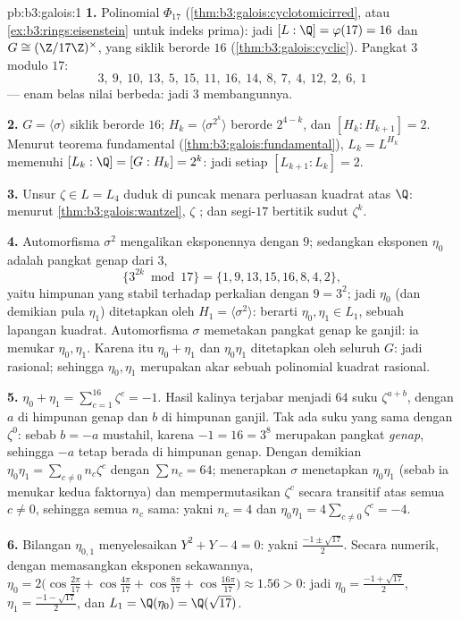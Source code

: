 \begin{solution}{pb:b3:galois:1}
\textbf{1.} Polinomial $\Phi_{17}$ 
(\cref{thm:b3:galois:cyclotomicirred}, atau
\cref{ex:b3:rings:eisenstein} untuk indeks prima): jadi $[L:\Q] =
\varphi(17) = 16$ dan $G \cong (\Z/17\Z)^\times$, yang siklik berorde
$16$ (\cref{thm:b3:galois:cyclic}). Pangkat $3$ modulo
$17$:
\[
3,\ 9,\ 10,\ 13,\ 5,\ 15,\ 11,\ 16,\ 14,\ 8,\ 7,\ 4,\ 12,\ 2,\
6,\ 1
\]
--- enam belas nilai berbeda: jadi $3$ membangunnya.

\textbf{2.} $G = \langle\sigma\rangle$ siklik berorde $16$;
$H_k = \langle\sigma^{2^k}\rangle$ berorde $2^{4-k}$, dan
$[H_k : H_{k+1}] = 2$. Menurut teorema fundamental
(\cref{thm:b3:galois:fundamental}), $L_k = L^{H_k}$ memenuhi
$[L_k : \Q] = [G : H_k] = 2^k$: jadi setiap $[L_{k+1}:L_k] = 2$.

\textbf{3.} Unsur $\zeta \in L = L_4$ duduk di puncak menara perluasan
kuadrat atas $\Q$: menurut \cref{thm:b3:galois:wantzel}, $\zeta$
\omterm{def:b3:galois:constructible}{dapat dilukis}; dan segi-$17$ bertitik sudut $\zeta^k$.

\textbf{4.} Automorfisma $\sigma^2$ mengalikan eksponennya dengan $9$; sedangkan
eksponen $\eta_0$ adalah pangkat genap dari $3$,
\[
\{3^{2k} \bmod 17\} = \{1, 9, 13, 15, 16, 8, 4, 2\},
\]
yaitu himpunan yang stabil terhadap perkalian dengan $9 = 3^2$; jadi $\eta_0$
(dan demikian pula $\eta_1$) ditetapkan oleh $H_1 =
\langle\sigma^2\rangle$: berarti $\eta_0, \eta_1 \in L_1$, sebuah lapangan
kuadrat. Automorfisma $\sigma$ memetakan pangkat genap ke ganjil: ia menukar $\eta_0,
\eta_1$. Karena itu $\eta_0 + \eta_1$ dan $\eta_0\eta_1$ ditetapkan oleh
seluruh $G$: jadi rasional; sehingga $\eta_0, \eta_1$ merupakan akar sebuah
polinomial kuadrat rasional.

\textbf{5.} $\eta_0 + \eta_1 = \sum_{c=1}^{16}\zeta^c = -1$.
Hasil kalinya terjabar menjadi $64$ suku $\zeta^{a + b}$, dengan $a$ di himpunan
genap dan $b$ di himpunan ganjil. Tak ada suku yang sama dengan $\zeta^0$: sebab $b = -a$
mustahil, karena $-1 = 16 = 3^8$ merupakan pangkat \emph{genap}, sehingga
$-a$ tetap berada di himpunan genap. Dengan demikian $\eta_0\eta_1 = \sum_{c \neq 0}
n_c\zeta^c$ dengan $\sum n_c = 64$; menerapkan $\sigma$ menetapkan
$\eta_0\eta_1$ (sebab ia menukar kedua faktornya) dan mempermutasikan $\zeta^c$
secara transitif atas semua $c \neq 0$, sehingga semua $n_c$ sama: yakni $n_c
= 4$ dan $\eta_0\eta_1 = 4\sum_{c\neq0}\zeta^c = -4$.

\textbf{6.} Bilangan $\eta_{0,1}$ menyelesaikan $Y^2 + Y - 4 = 0$: yakni $\frac{-1 \pm
\sqrt{17}}2$. Secara numerik, dengan memasangkan eksponen sekawannya,
$\eta_0 = 2\bigl(\cos\tfrac{2\pi}{17} + \cos\tfrac{4\pi}{17} +
\cos\tfrac{8\pi}{17} + \cos\tfrac{16\pi}{17}\bigr) \approx 1.56
> 0$: jadi $\eta_0 = \frac{-1+\sqrt{17}}2$, $\eta_1 =
\frac{-1-\sqrt{17}}2$, dan $L_1 = \Q(\eta_0) = \Q(\sqrt{17})$.


\end{solution}
